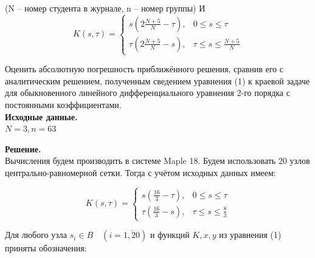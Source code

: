 \documentclass[14pt,a4paper]{scrartcl}
\begin{document}
(N -- номер студента в журнале, n -- номер группы)
И
\begin{equation*}
	K(s, \tau)=\left\{\begin{array}{ll}{s\left(2 \frac{N+5}{N}-\tau\right),} & {0 \leq s \leq \tau} \\ {\tau\left(2 \frac{N+5}{N}-s\right),} & {\tau \leq s \leq \frac{N+5}{N}}\end{array}\right.
\end{equation*}

Оценить абсолютную погрешность приближённого решения, сравнив его с аналитическим решением, полученным сведением уравнения (1) к краевой
задаче для обыкновенного линейного дифференциального уравнения 2-го порядка с постоянными коэффициентами.\\

\textbf{Исходные данные.}\\
$N = 3, n = 63$


\textbf{Решение.}\\
Вычисления будем производить в системе Maple 18. Будем использовать 20 узлов центрально-равномерной сетки. Тогда с учётом исходных данных имеем:

\begin{equation*}
	K(s, \tau)=\left\{\begin{array}{ll}{s\left( \frac{16}{3}-\tau\right),} & {0 \leq s \leq \tau} \\ {\tau\left( \frac{16}{3}-s\right),} & {\tau \leq s \leq \frac{8}{3}}\end{array}\right.
\end{equation*}

Для любого узла $s_i \in B \quad (i = \overline{1,20})$ и функций $K,x,y$ из уравнения (1) приняты обозначения:

\begin{figure}[H]
	\begin{minipage}[h]{1\linewidth}
		  \\
	\end{minipage}
\end{figure}
\end{document}
